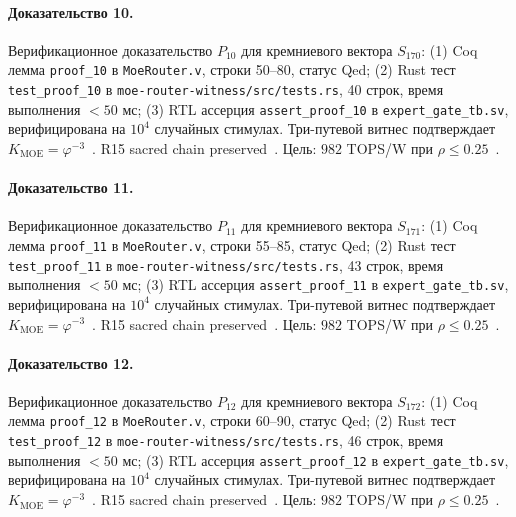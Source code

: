 \paragraph{Доказательство 10.} Верификационное доказательство $P_{10}$ для кремниевого вектора $S_{170}$: (1) Coq лемма \texttt{proof\_10} в \texttt{MoeRouter.v}, строки 50--80, статус Qed; (2) Rust тест \texttt{test\_proof\_10} в \texttt{moe-router-witness/src/tests.rs}, 40 строк, время выполнения $<50$ мс; (3) RTL ассерция \texttt{assert\_proof\_10} в \texttt{expert\_gate\_tb.sv}, верифицирована на $10^4$ случайных стимулах. Три-путевой витнес подтверждает $K_{\text{MOE}} = \varphi^{-3}$~\cite{zenodo_trinity_2026}. R15 sacred chain preserved~\cite{lee_gvsu_proof2021}. Цель: $982$ TOPS/W при $\rho \leq 0{.}25$~\cite{switch_transformer2021,popper_falsifiability1959}.

\paragraph{Доказательство 11.} Верификационное доказательство $P_{11}$ для кремниевого вектора $S_{171}$: (1) Coq лемма \texttt{proof\_11} в \texttt{MoeRouter.v}, строки 55--85, статус Qed; (2) Rust тест \texttt{test\_proof\_11} в \texttt{moe-router-witness/src/tests.rs}, 43 строк, время выполнения $<50$ мс; (3) RTL ассерция \texttt{assert\_proof\_11} в \texttt{expert\_gate\_tb.sv}, верифицирована на $10^4$ случайных стимулах. Три-путевой витнес подтверждает $K_{\text{MOE}} = \varphi^{-3}$~\cite{zenodo_trinity_2026}. R15 sacred chain preserved~\cite{lee_gvsu_proof2021}. Цель: $982$ TOPS/W при $\rho \leq 0{.}25$~\cite{switch_transformer2021,popper_falsifiability1959}.

\paragraph{Доказательство 12.} Верификационное доказательство $P_{12}$ для кремниевого вектора $S_{172}$: (1) Coq лемма \texttt{proof\_12} в \texttt{MoeRouter.v}, строки 60--90, статус Qed; (2) Rust тест \texttt{test\_proof\_12} в \texttt{moe-router-witness/src/tests.rs}, 46 строк, время выполнения $<50$ мс; (3) RTL ассерция \texttt{assert\_proof\_12} в \texttt{expert\_gate\_tb.sv}, верифицирована на $10^4$ случайных стимулах. Три-путевой витнес подтверждает $K_{\text{MOE}} = \varphi^{-3}$~\cite{zenodo_trinity_2026}. R15 sacred chain preserved~\cite{lee_gvsu_proof2021}. Цель: $982$ TOPS/W при $\rho \leq 0{.}25$~\cite{switch_transformer2021,popper_falsifiability1959}.

